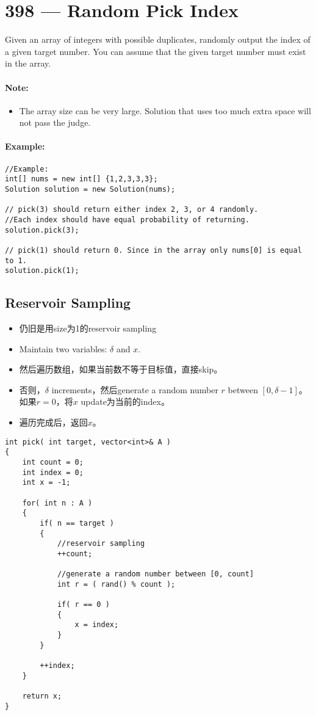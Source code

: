 \section{398 --- Random Pick Index}
Given an array of integers with possible duplicates, randomly output the index of a given target number. You can assume that the given target number must exist in the array.

\paragraph{Note:}
\begin{itemize}
\item The array size can be very large. Solution that uses too much extra space will not pass the judge.
\end{itemize}

\paragraph{Example:}


\begin{lstlisting}[style=customc]
//Example:
int[] nums = new int[] {1,2,3,3,3};
Solution solution = new Solution(nums);

// pick(3) should return either index 2, 3, or 4 randomly. 
//Each index should have equal probability of returning.
solution.pick(3);

// pick(1) should return 0. Since in the array only nums[0] is equal to 1.
solution.pick(1);
\end{lstlisting}

\subsection{Reservoir Sampling}
\begin{itemize}
\item 仍旧是用size为1的reservoir sampling
\item Maintain two variables: $\delta$ and $x$.
\item 然后遍历数组，如果当前数不等于目标值，直接skip。
\item 否则，$\delta$ increments，然后generate a random number $r$ between $[0, \delta-1]$。如果$r=0$，将$x$ update为当前的index。
\item 遍历完成后，返回$x$。
\end{itemize}

\setcounter{lstlisting}{0}
\begin{lstlisting}[style=customc, caption={Reservoir Sampling}]
int pick( int target, vector<int>& A )
{
    int count = 0;
    int index = 0;
    int x = -1;

    for( int n : A )
    {
        if( n == target )
        {
            //reservoir sampling
            ++count;

            //generate a random number between [0, count]
            int r = ( rand() % count );

            if( r == 0 )
            {
                x = index;
            }
        }

        ++index;
    }

    return x;
}
\end{lstlisting}

